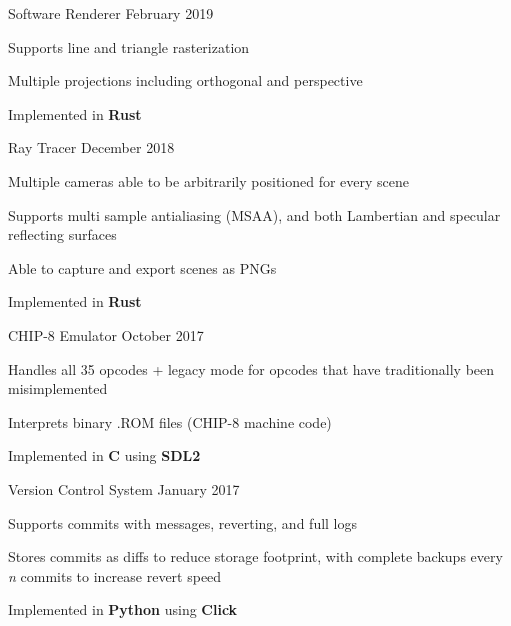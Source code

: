 

\begin{cventries}
    \cventry
    {Software Renderer} %
    {} %
    {}{February 2019}{
        \begin{cvitems} %
            \item {Supports line and triangle rasterization}
            \item {Multiple projections including orthogonal and perspective}
            \item {Implemented in \textbf{Rust}}
        \end{cvitems}
    }

    \cventry
    {Ray Tracer} %
    {} %
    {}{December 2018}{
        \begin{cvitems} %
            \item {Multiple cameras able to be arbitrarily positioned for every scene}
            \item {Supports multi sample antialiasing (MSAA), and both Lambertian and specular reflecting surfaces}
            \item {Able to capture and export scenes as PNGs}
            \item {Implemented in \textbf{Rust}}
        \end{cvitems}
    }

    \cventry
    {CHIP-8 Emulator} %
    {} %
    {}{October 2017}{
        \begin{cvitems} %
            \item {Handles all 35 opcodes + legacy mode for opcodes that have traditionally been misimplemented}
            \item {Interprets binary .ROM files (CHIP-8 machine code)}
            \item {Implemented in \textbf{C} using \textbf{SDL2}}
        \end{cvitems}
    }

    \cventry
    {Version Control System} %
    {} %
    {}{January 2017}{
        \begin{cvitems} %
            \item {Supports commits with messages, reverting, and full logs}
            \item {Stores commits as diffs to reduce storage footprint, with complete backups every \textit{n} commits to increase revert speed}
            \item {Implemented in \textbf{Python} using \textbf{Click}}
        \end{cvitems}
    }


\end{cventries}
